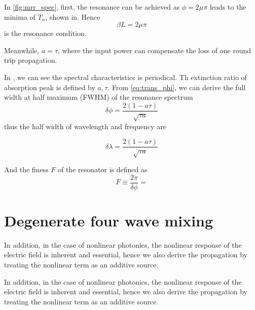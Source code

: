 \documentclass[final]{kuee_en}
\begin{document}
In \autoref{fig:mrr_spec}, first, the resonance can be achieved as $\phi=2 \mu \pi$ leads to the minima of $T_n$, shown in. Hence
\begin{equation}
    \beta L =2 \mu \pi
\end{equation}
is the resonance condition. 

Meanwhile, $a=\tau$, where the input power can compensate the loss of one round trip propagation.

In , we can see the spectral characteristics is periodical. Th extinction ratio of absorption peak is defined by $a,\tau$. From \autoref{eq:trans_phi}, we can derive the full width at half maximum (FWHM) of the resonance spectrum
\begin{equation}\label{eq:fwhm_phi}
    \delta\phi = \frac{2(1- a \tau)}{\sqrt{\tau a}}
\end{equation}
thus the half width of wavelength and frequency are

\begin{equation}
    \delta \lambda =  \frac{2(1- a \tau)}{\sqrt{\tau a}}
\end{equation}

And the finess $F$ of the resonator is defined as
\begin{equation}
    F \equiv \frac{2\pi}{\delta\phi} = 
\end{equation}























\section{Degenerate four wave mixing}

In addition, in the case of nonlinear photonics, the nonlinear response of the
electric field is inherent and essential, hence we also derive the propagation
by treating the nonlinear term as an additive source.



In addition, in the case of nonlinear photonics, the nonlinear response of the
electric field is inherent and essential, hence we also derive the propagation
by treating the nonlinear term as an additive source.
\end{document}
